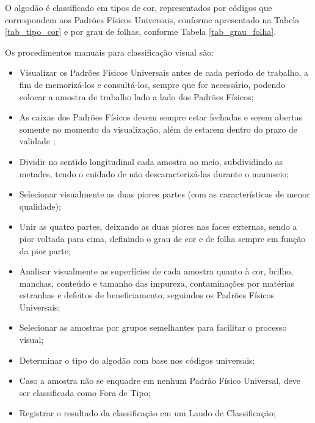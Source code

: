 \documentclass[12pt]{article}
\begin{document}
O algodão é classificado em tipos de cor, representados por códigos que correspondem aos Padrões Físicos Universais, conforme apresentado na Tabela \ref{tab_tipo_cor} e por grau de folhas, conforme Tabela \ref{tab_grau_folha}.

Os procedimentos manuais para classificação visual são:

\begin{itemize}
    \item Visualizar os Padrões Físicos Universais antes de cada período de trabalho, a fim de memorizá-los e consultá-los, sempre que for necessário, podendo colocar a amostra de trabalho lado a lado dos Padrões Físicos;
    \item As caixas dos Padrões Físicos devem sempre estar fechadas e serem abertas somente no momento da visualização, além de estarem dentro do prazo de validade ; 
    \item Dividir no sentido longitudinal cada amostra ao meio, subdividindo as metades, tendo o cuidado de não descaracterizá-las durante o manuseio;
    \item Selecionar visualmente as duas piores partes (com as características de menor qualidade);
    \item Unir as quatro partes, deixando as duas piores nas faces externas, sendo a pior voltada para cima, definindo o grau de cor e de folha sempre em função da pior parte;
    \item Analisar visualmente as superfícies de cada amostra quanto à cor, brilho, manchas, conteúdo e tamanho das impureza, contaminações por matérias estranhas e defeitos de beneficiamento, seguindos os Padrões Físicos Universais;
    \item Selecionar as amostras por grupos semelhantes para facilitar o processo visual;
    \item Determinar o tipo do algodão com base nos códigos universais;
    \item Caso a amostra não se enquadre em nenhum Padrão Físico Universal, deve ser classificada como Fora de Tipo;
    \item Registrar o resultado da classificação em um Laudo de Classificação;
\end{itemize}




 
\end{document}
